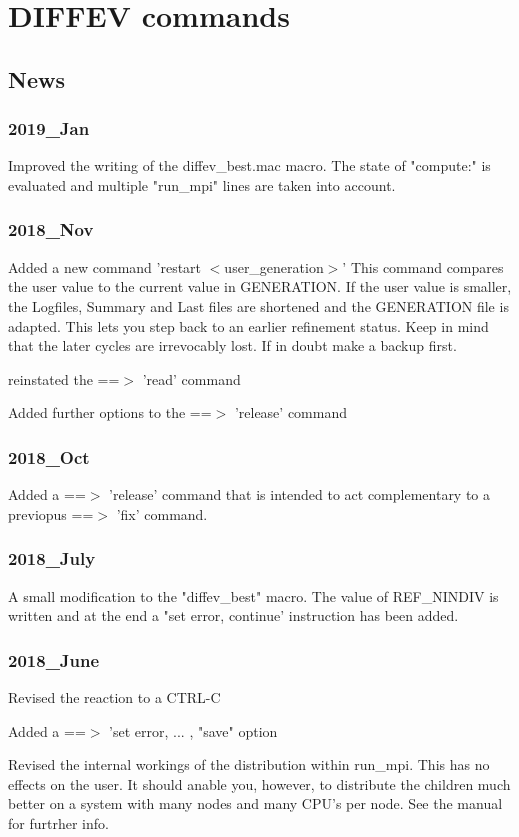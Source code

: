 \chapter{DIFFEV commands}
\section{News}
\subsection*{2019\_Jan}
\par
Improved the writing of the diffev\_best.mac macro. 
The state of "compute:" is evaluated and multiple "run\_mpi" lines 
are taken into account. 
\subsection*{2018\_Nov}
\par
Added a new command 'restart $ <$user\_generation$> $' This command compares 
the user value to the current value in GENERATION. If the user 
value is smaller, the Logfiles, Summary and Last files are 
shortened and the GENERATION file is adapted. This lets you step 
back to an earlier refinement status. Keep in mind that the later 
cycles are irrevocably lost. If in doubt make a backup first. 
\par
reinstated the ==$> $ 'read' command 
\par
Added further options to the ==$> $ 'release' command 
\subsection*{2018\_Oct}
\par
Added a ==$> $ 'release' command that is intended to act 
complementary to a previopus ==$> $ 'fix' command. 
\subsection*{2018\_July}
\par
A small modification to the "diffev\_best" macro. 
The value of REF\_NINDIV is written and at the end a 
"set error, continue' instruction has been added. 
\subsection*{2018\_June}
\par
Revised the reaction to a CTRL-C 
\par
Added a ==$> $ 'set error, ... , "save" option 
\par
Revised the internal workings of the distribution within 
run\_mpi. This has no effects on the user. It should anable you, 
however, to distribute the children much better on a system with 
many nodes and many CPU's per node. See the manual for furtrher info. 
